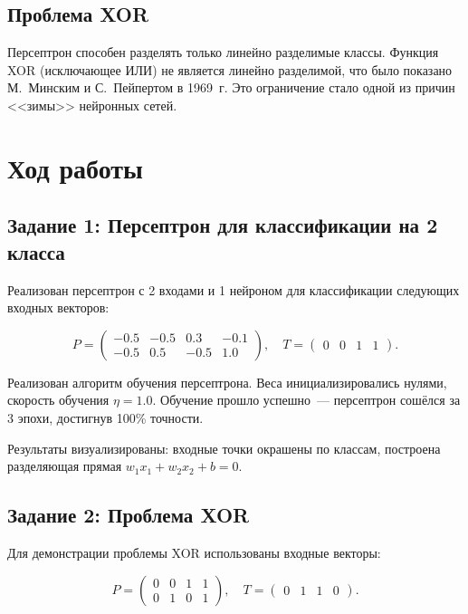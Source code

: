 \documentclass[14pt,a4paper]{extarticle}
\begin{document}
\subsection{Проблема XOR}

Персептрон способен разделять только линейно разделимые классы. Функция XOR (исключающее ИЛИ) не является линейно разделимой, что было показано М.~Минским и С.~Пейпертом в 1969~г. Это ограничение стало одной из причин <<зимы>> нейронных сетей.

\section{Ход работы}

\subsection{Задание 1: Персептрон для классификации на 2 класса}

Реализован персептрон с 2 входами и 1 нейроном для классификации следующих входных векторов:

\begin{equation}
P = \begin{pmatrix} -0.5 & -0.5 & 0.3 & -0.1 \\ -0.5 & 0.5 & -0.5 & 1.0 \end{pmatrix}, \quad
T = \begin{pmatrix} 0 & 0 & 1 & 1 \end{pmatrix}.
\end{equation}

Реализован алгоритм обучения персептрона. Веса инициализировались нулями, скорость обучения $\eta = 1.0$. Обучение прошло успешно~--- персептрон сошёлся за 3 эпохи, достигнув 100\% точности.

Результаты визуализированы: входные точки окрашены по классам, построена разделяющая прямая $w_1 x_1 + w_2 x_2 + b = 0$.

\subsection{Задание 2: Проблема XOR}

Для демонстрации проблемы XOR использованы входные векторы:

\begin{equation}
P = \begin{pmatrix} 0 & 0 & 1 & 1 \\ 0 & 1 & 0 & 1 \end{pmatrix}, \quad
T = \begin{pmatrix} 0 & 1 & 1 & 0 \end{pmatrix}.
\end{equation}
\end{document}
